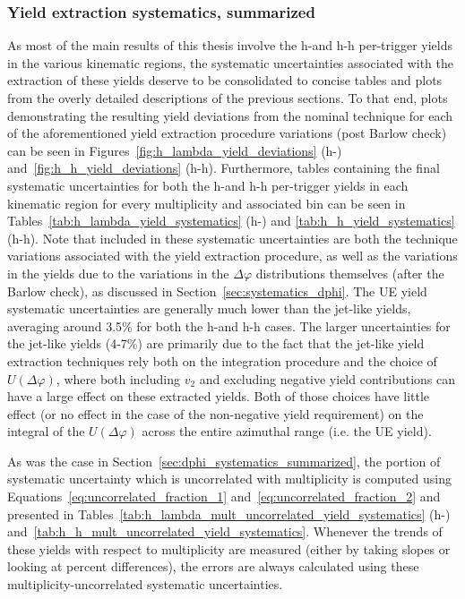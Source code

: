 \subsubsection{Yield extraction systematics, summarized}
\label{sec:yield_systematics_summary}
As most of the main results of this thesis involve the h-\lmb and h-h per-trigger yields in the various kinematic regions, the systematic uncertainties associated with the extraction of these yields deserve to be consolidated to concise tables and plots from the overly detailed descriptions of the previous sections. To that end, plots demonstrating the resulting yield deviations from the nominal technique for each of the aforementioned yield extraction procedure variations (post Barlow check) can be seen in Figures~\ref{fig:h_lambda_yield_deviations} (h-\lmb) and~\ref{fig:h_h_yield_deviations} (h-h). Furthermore, tables containing the final systematic uncertainties for both the h-\lmb and h-h per-trigger yields in each kinematic region for every multiplicity and associated \pt bin can be seen in Tables~\ref{tab:h_lambda_yield_systematics} (h-\lmb) and \ref{tab:h_h_yield_systematics} (h-h). Note that included in these systematic uncertainties are both the technique variations associated with the yield extraction procedure, as well as the variations in the yields due to the variations in the $\Delta\varphi$ distributions themselves (after the Barlow check), as discussed in Section~\ref{sec:systematics_dphi}. The UE yield systematic uncertainties are generally much lower than the jet-like yields, averaging around 3.5\% for both the h-\lmb and h-h cases. The larger uncertainties for the jet-like yields (4-7\%) are primarily due to the fact that the jet-like yield extraction techniques rely both on the integration procedure and the choice of $U(\Delta\varphi)$, where both including $v_{2}$ and excluding negative yield contributions can have a large effect on these extracted yields. Both of those choices have little effect (or no effect in the case of the non-negative yield requirement) on the integral of the $U(\Delta\varphi)$ across the entire azimuthal range (i.e. the UE yield). 

As was the case in Section~\ref{sec:dphi_systematics_summarized}, the portion of systematic uncertainty which is uncorrelated with multiplicity is computed using Equations~\ref{eq:uncorrelated_fraction_1} and~\ref{eq:uncorrelated_fraction_2} and presented in Tables~\ref{tab:h_lambda_mult_uncorrelated_yield_systematics} (h-\lmb) and~\ref{tab:h_h_mult_uncorrelated_yield_systematics}. Whenever the trends of these yields with respect to multiplicity are measured (either by taking slopes or looking at percent differences), the errors are always calculated using these multiplicity-uncorrelated systematic uncertainties.


